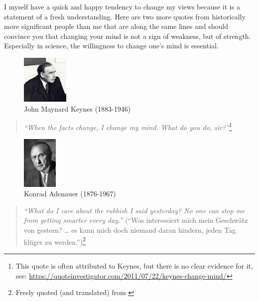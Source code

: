 \documentclass[
  12pt,
  oneside]{book}
\theoremstyle{definition}
\theoremstyle{definition}
\theoremstyle{definition}
\theoremstyle{definition}
\theoremstyle{remark}
\begin{document}
I myself have a quick and happy tendency to change my views because it is a statement of a fresh understanding. Here are two more quotes from historically more significant people than me that are along the same lines and should convince you that changing your mind is not a sign of weakness, but of strength. Especially in science, the willingness to change one's mind is essential.

\begin{figure}
\centering
\includegraphics[width=0.2\textwidth,height=\textheight]{fig/Keynes_1933.jpg}
\caption[\label{fig:keynes} John Maynard Keynes (1883-1946)]{\label{fig:keynes} John Maynard Keynes (1883-1946)\footnotemark{}}
\end{figure}

\begin{quote}
\emph{``When the facts change, I change my mind. What do you do, sir?''}\footnote{This quote is often attributed to Keynes, but there is no clear evidence for it, see: \url{https://quoteinvestigator.com/2011/07/22/keynes-change-mind/}}
\end{quote}

\begin{figure}
\centering
\includegraphics[width=0.15\textwidth,height=\textheight]{fig/Bundesarchiv_B_145_Bild-F078072-0004,_Konrad_Adenauer.jpg}
\caption[\label{fig:adenauer} Konrad Adenauer (1876-1967)]{\label{fig:adenauer} Konrad Adenauer (1876-1967)\footnotemark{}}
\end{figure}

\begin{quote}
\emph{``What do I care about the rubbish I said yesterday? No one can stop me from getting smarter every day.''} (``Was interessiert mich mein Geschwätz von gestern? \ldots{} es kann mich doch niemand daran hindern, jeden Tag klüger zu werden.'')\footnote{Freely quoted (and translated) from \citet[p.~521]{Weymar1955Konrad}}
\end{quote}
\end{document}
